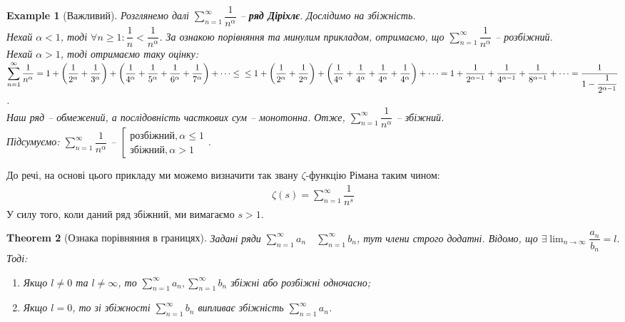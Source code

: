 \documentclass[a4paper, 10pt]{article}
\def\huge{\displaystyle}
\theoremstyle{theoremdd}
\newtheorem{theorem}{Theorem}[subsection]
\theoremstyle{theoremdd}
\theoremstyle{theoremdd}
\theoremstyle{theoremdd}
\theoremstyle{theoremdd}
\newtheorem{example}[theorem]{Example}
\theoremstyle{theoremdd}
\theoremstyle{theoremdd}
\theoremstyle{theoremdd}
\theoremstyle{theoremdd}
\begin{document}
\begin{example}[Важливий]
Розглянемо далі $\huge \sum_{n=1}^{\infty} \dfrac{1}{n^\alpha}$ -- \textbf{ряд Діріхлє}. Дослідимо на збіжність.\\
Нехай $\alpha < 1$, тоді $\forall n \geq 1: \dfrac{1}{n} < \dfrac{1}{n^{\alpha}}$. За ознакою порівняння та минулим прикладом, отримаємо, що $\huge \sum_{n=1}^{\infty} \dfrac{1}{n^\alpha}$ -- розбіжний.\\
Нехай $\alpha > 1$, тоді отримаємо таку оцінку:\\
$\displaystyle\sum_{n=1}^\infty \dfrac{1}{n^\alpha} = 1 + \left( \dfrac{1}{2^\alpha} + \dfrac{1}{3^\alpha} \right) + \left( \dfrac{1}{4^\alpha} + \dfrac{1}{5^\alpha} + \dfrac{1}{6^\alpha} + \dfrac{1}{7^\alpha}  \right) + \dots \leq \\
\leq 1 + \left( \dfrac{1}{2^\alpha} + \dfrac{1}{2^\alpha} \right) + \left( \dfrac{1}{4^\alpha} + \dfrac{1}{4^\alpha} + \dfrac{1}{4^\alpha} + \dfrac{1}{4^\alpha}  \right) + \dots = 1 + \dfrac{1}{2^{\alpha-1}} + \dfrac{1}{4^{\alpha-1}} + \dfrac{1}{8^{\alpha-1}} + \dots = \dfrac{1}{1-\dfrac{1}{2^{\alpha-1}}}$.\\
Наш ряд -- обмежений, а послідовність часткових сум -- монотонна. Отже, $\huge \sum_{n=1}^\infty \dfrac{1}{n^{\alpha}}$ -- збіжний.\\
Підсумуємо: $\huge \sum_{n=1}^{\infty} \dfrac{1}{n^{\alpha}}$ -- $\left[ \begin{gathered} \textrm{розбіжний}, \alpha \leq 1 \\ \textrm{збіжний}, \alpha > 1   \end{gathered} \right.$.
\end{example}

\noindent До речі, на основі цього прикладу ми можемо визначити так звану $\zeta$-функцію Рімана таким чином:
\begin{align*}
\zeta(s) = \sum_{n=1}^\infty \dfrac{1}{n^s}
\end{align*}
У силу того, коли даний ряд збіжний, ми вимагаємо $s > 1$.

\begin{theorem}[Ознака порівняння в границях]
Задані ряди $\huge \sum_{n=1}^{\infty} a_n \quad \sum_{n=1}^{\infty} b_n$, тут члени строго додатні. Відомо, що $\exists \huge \lim_{n \to \infty} \dfrac{a_n}{b_n} = l$. Тоді:
\begin{enumerate}[nosep,wide=0pt,label={\arabic*)}]
\item Якщо $l \neq 0$ та $l \neq \infty$, то $\huge \sum_{n=1}^{\infty} a_n, \sum_{n=1}^{\infty} b_n$ збіжні або розбіжні одночасно;
\item Якщо $l = 0$, то зі збіжності $\huge \sum_{n=1}^{\infty} b_n$ випливає збіжність $\huge \sum_{n=1}^{\infty} a_n$.
\end{enumerate}
\end{theorem}
\end{document}
